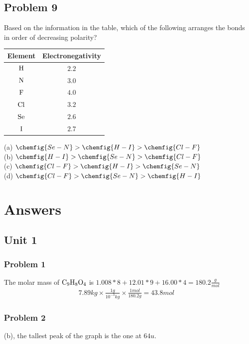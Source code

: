 \documentclass{article}
\begin{document}
\subsection*{Problem 9}
Based on the information in the table, which of the following arranges the bonds in order of decreasing polarity? \\
\begin{center}
\begin{tabular}{|cc|}
    \hline 
    Element & Electronegativity \\ [0.5 ex]
    \hline \hline
    \(\ce{H}\) & \(2.2\)\\
    \(\ce{N}\) & \(3.0\) \\
    \(\ce{F}\) & \(4.0\) \\
    \(\ce{Cl}\) & \(3.2\) \\
    \(\ce{Se}\) & \(2.6\) \\
    \(\ce{I}\) & \(2.7\)\\ [1ex]
    \hline
\end{tabular}
\end{center} 
(a) \(\chemfig{Se-N} > \chemfig{H-I} > \chemfig{Cl-F}\) \\
(b) \(\chemfig{H-I} > \chemfig{Se-N} >\chemfig{Cl-F}\)\\
(c) \(\chemfig{Cl-F} > \chemfig{H-I} > \chemfig{Se-N}\)\\
(d) \(\chemfig{Cl-F} > \chemfig{Se-N} > \chemfig{H-I}\)


\newpage
\section{Answers}
\subsection{Unit 1}
\subsubsection*{Problem 1}
The molar mass of \(\ce{C_9H_8O_4}\) is \(1.008*8 + 12.01*9 + 16.00*4 = 180.2 \frac{g}{mol}\)
\begin{equation}
\begin{aligned}
    7.89kg \times \frac{1g}{10^{-3}kg} \times \frac{1mol}{180.2g} = 43.8mol
\end{aligned}
\end{equation}
\subsubsection*{Problem 2}
(b), the tallest peak of the graph is the one at \(64u\). 
\end{document}
